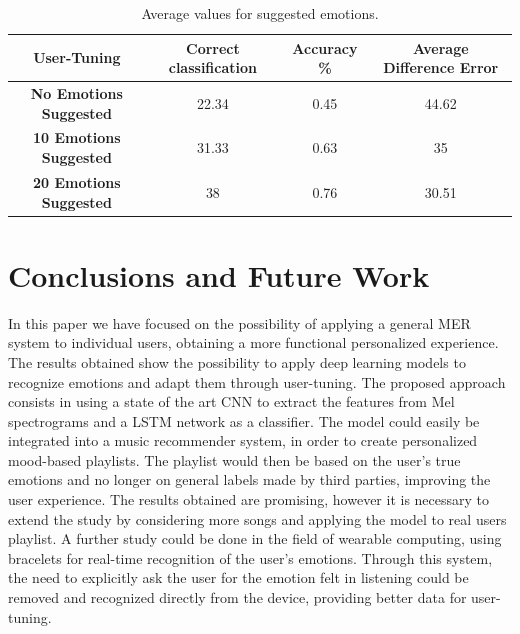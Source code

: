 \documentclass[runningheads]{llncs}
\begin{document}
\begin{table}
\caption{Average values for suggested emotions.}
\label{tab4}
\centering
\begin{tabular}{|c|c|c|c|}
\hline
\textbf{User-Tuning} &  \textbf{Correct classification} & \textbf{Accuracy \%}  & \textbf{Average Difference Error}\\
\hline
\textbf{No Emotions Suggested} &  22.34  & 0.45 & 44.62\\
\hline
\textbf{10 Emotions Suggested} &  31.33  & 0.63 & 35\\
\hline
\textbf{20 Emotions Suggested} &  38  & 0.76 & 30.51\\
\hline


\hline
\end{tabular}
\end{table}

\newpage


\section{Conclusions and Future Work}

In this paper we have focused on the possibility of applying a general MER system to individual users, obtaining a more functional personalized experience. The results obtained show the possibility to apply deep learning models to recognize emotions and adapt them through user-tuning. The proposed approach consists in using a state of the art CNN to extract the features from Mel spectrograms and a LSTM network as a classifier. The model could easily be integrated into a music recommender system, in order to create personalized mood-based playlists. The playlist would then be based on the user's true emotions and no longer on general labels made by third parties, improving the user experience. The results obtained are promising, however it is necessary to extend the study by considering more songs and applying the model to real users playlist. A further study could be done in the field of wearable computing, using bracelets for real-time recognition of the user's emotions. Through this system, the need to explicitly ask the user for the emotion felt in listening could be removed and recognized directly from the device, providing better data for user-tuning.




\end{document}
